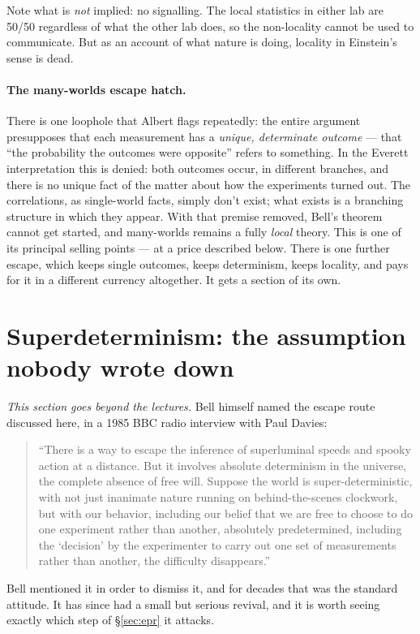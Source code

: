 \documentclass[11pt,a4paper]{article}
\theoremstyle{remark}
\begin{document}
Note what is \emph{not} implied: no signalling. The local statistics in either
lab are 50/50 regardless of what the other lab does, so the non-locality cannot
be used to communicate. But as an account of what nature is doing, locality in
Einstein's sense is dead.

\paragraph{The many-worlds escape hatch.}
There is one loophole that Albert flags repeatedly: the entire argument
presupposes that each measurement has a \emph{unique, determinate outcome} ---
that ``the probability the outcomes were opposite'' refers to something. In the
Everett interpretation this is denied: both outcomes occur, in different branches,
and there is no unique fact of the matter about how the experiments turned out.
The correlations, as single-world facts, simply don't exist; what exists is a
branching structure in which they appear. With that premise removed, Bell's
theorem cannot get started, and many-worlds remains a fully \emph{local} theory.
This is one of its principal selling points --- at a price described below.
There is one further escape, which keeps single outcomes, keeps determinism, keeps
locality, and pays for it in a different currency altogether. It gets a section
of its own.

\section{Superdeterminism: the assumption nobody wrote down}\label{sec:sd}

\emph{This section goes beyond the lectures.} Bell himself named the escape
route discussed here, in a 1985 BBC radio interview with Paul Davies:
\begin{quote}
``There is a way to escape the inference of superluminal speeds and spooky
action at a distance. But it involves absolute determinism in the universe, the
complete absence of free will. Suppose the world is super-deterministic, with not
just inanimate nature running on behind-the-scenes clockwork, but with our
behavior, including our belief that we are free to choose to do one experiment
rather than another, absolutely predetermined, including the `decision' by the
experimenter to carry out one set of measurements rather than another, the
difficulty disappears.''
\end{quote}
Bell mentioned it in order to dismiss it, and for decades that was the standard
attitude. It has since had a small but serious revival, and it is worth seeing
exactly which step of \S\ref{sec:epr} it attacks.
\end{document}
